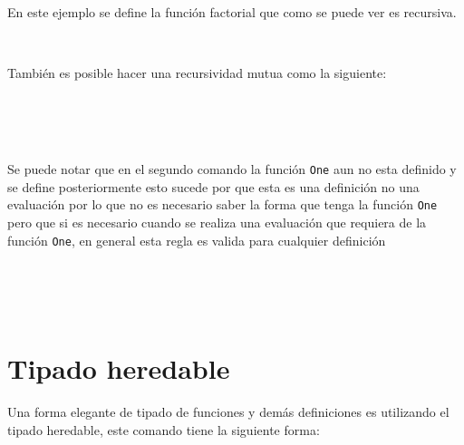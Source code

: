       \begin{fxcode}
         \\
      \end{fxcode}
      
      En este ejemplo se define la función factorial que como se puede ver es recursiva.
      
      \begin{fxcode}
         \\
      \end{fxcode}
      
      También es posible hacer una recursividad mutua como la siguiente:
      
      \begin{fxcode}
         \\
         \\
         \\
      \end{fxcode}
      
      Se puede notar que en el segundo comando la función \texttt{One} aun no esta definido y se define posteriormente esto sucede por que esta es una definición no una evaluación por lo que no es necesario saber la forma que tenga la función \texttt{One} pero que si es necesario cuando se realiza una evaluación que requiera de la función \texttt{One}, en general esta regla es valida para cualquier definición
      
      \begin{fxcode}
         \\
         \outcode{\textquotedbl 12121\textquotedbl}\\
         \\
         \outcode{\textquotedbl 21212\textquotedbl}
      \end{fxcode}
      
   \section{Tipado heredable}
      Una forma elegante de tipado de funciones y demás definiciones es utilizando el tipado heredable, este comando tiene la siguiente forma:
      \\
      
